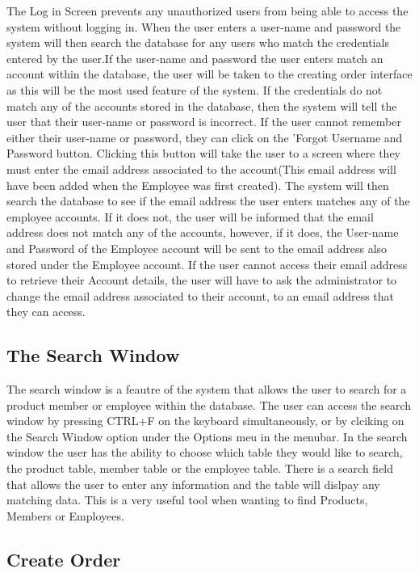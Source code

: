 The Log in Screen prevents any unauthorized users from being able to access the system without logging in. When the user enters a user-name and password the system will then search the database for any users who match the credentials entered by the user.If the user-name and password the user enters match an account within the database, the user will be taken to the creating order interface as this will be the most used feature of the system. If the credentials do not match any of the accounts stored in the database, then the system will tell the user that their user-name or password is incorrect. If the user cannot remember either their user-name or password, they can click on the 'Forgot Username and Password button. Clicking this button will take the user to a screen where they must enter the email address associated to the account(This email address will have been added when the Employee was first created). The system will then search the database to see if the email address the user enters matches any of the employee accounts. If it does not, the user will be informed that the email address does not match any of the accounts, however, if it does, the User-name and Password of the Employee account will be sent to the email address also stored under the Employee account. If the user cannot access their email address to retrieve their Account details, the user will have to ask the administrator to change the email address associated to their account, to an email address that they can access.

\subsection{The Search Window}

The search window is a feautre of the system that allows the user to search for a product member or employee within the database. The user can access the search window by pressing CTRL+F on the keyboard simultaneously, or by clciking on the Search Window option under the Options meu in the menubar. In the search window the user has the ability to choose which table they would like to search, the product table, member table or the employee table. There is a search field that allows the user to enter any information and the table will dislpay any matching data. This is a very useful tool when wanting to find Products, Members or Employees.

\subsection{Create Order}

